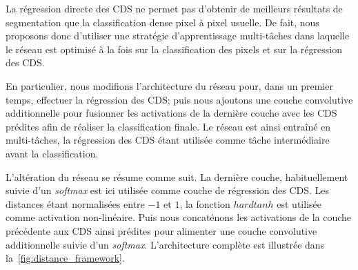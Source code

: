 
La régression directe des CDS ne permet pas d'obtenir de meilleurs résultats de segmentation que la classification dense pixel à pixel usuelle. De fait, nous proposons donc d'utiliser une stratégie d'apprentissage multi-tâches dans laquelle le réseau est optimisé à la fois sur la classification des pixels et sur la régression des CDS.

En particulier, nous modifions l'architecture du réseau pour, dans un premier temps, effectuer la régression des CDS; puis nous ajoutons une couche convolutive additionnelle pour fusionner les activations de la dernière couche avec les CDS prédites afin de réaliser la classification finale. Le réseau est ainsi entraîné en multi-tâches, la régression des CDS étant utilisée comme tâche intermédiaire avant la classification.

L'altération du réseau se résume comme suit. La dernière couche, habituellement suivie d'un \textit{softmax} est ici utilisée comme couche de régression des CDS. Les distances étant normalisées entre $-1$ et $1$, la fonction $hardtanh$ est utilisée comme activation non-linéaire. Puis nous concaténons les activations de la couche précédente aux CDS ainsi prédites pour alimenter une couche convolutive additionnelle suivie d'un \textit{softmax}. L'architecture complète est illustrée dans la~\cref{fig:distance_framework}.

